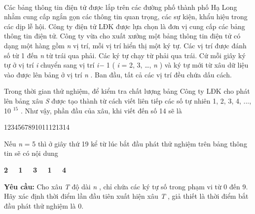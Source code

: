  

Các bảng thông tin điện tử được lắp trên các đường phố thành phố Hạ Long nhằm cung cấp ngắn gọn các thông tin quan trọng, các sự kiện, khẩu hiệu trong các dịp lễ hội. Công ty điện tử LĐK được lựa chọn là đơn vị cung cấp các bảng thông tin điện tử. Công ty vừa cho xuất xưởng một bảng thông tin điện tử có dạng một hàng gồm \emph{ n } vị trí, mỗi vị trí hiển thị một ký tự. Các vị trí được đánh số từ 1 đến \emph{ n } từ trái qua phải. Các ký tự chạy từ phải qua trái. Cứ mỗi giây ký tự ở vị trí \emph{ i } chuyển sang vị trí \emph{ i− } 1 ( \emph{ i } = 2, 3, …, \emph{ n } ) và ký tự mới từ xâu dữ liệu vào được lên bảng ở vị trí \emph{ n } . Ban đầu, tất cả các vị trí đều chứa dấu cách.

Trong thời gian thử nghiệm, để kiểm tra chất lượng bảng Công ty LĐK cho phát lên bảng xâu \emph{ S } được tạo thành từ cách viết liên tiếp các số tự nhiên 1, 2, 3, 4, ..., 10 $^ 15 $ . Như vậy, phần đầu của xâu, khi viết đến số 14 sẽ là

1234567891011121314

Nếu \emph{ n } = 5 thì ở giây thứ 19 kể từ lúc bắt đầu phát thử nghiệm trên bảng thông tin sẽ có nội dung

\textbf{2   1   3   1   4 }

\textbf{Yêu cầu: } Cho xâu \emph{ T } độ dài \emph{ n } , chỉ chứa các ký tự số trong phạm vi từ 0 đến 9. Hãy xác định thời điểm lần đầu tiên xuất hiện xâu \emph{ T } , giả thiết là thời điểm bắt đầu phát thử nghiệm là 0.

\